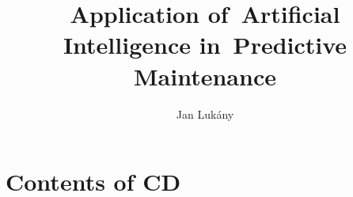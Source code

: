 \documentclass[thesis=M,english]{FITthesis}[2019/12/23]
\title{Application of~Artificial Intelligence in~Predictive Maintenance}
\author{Jan Luk\'any} %
\begin{document}















\appendix

\printglossary

\chapter{Contents of CD}\label{app:CDcontent}


\end{document}
